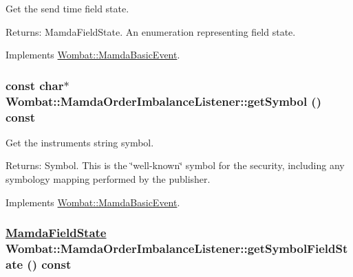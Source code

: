 Get the send time field state. 

\begin{Desc}
\item[Returns:]Mamda\-Field\-State. An enumeration representing field state. \end{Desc}


Implements \hyperlink{classWombat_1_1MamdaBasicEvent_418ecb29b412cd42581b54c87b5360fd}{Wombat::Mamda\-Basic\-Event}.\hypertarget{classWombat_1_1MamdaOrderImbalanceListener_de961c5bbeedc9f69136682e1adaf495}{
\subsubsection[getSymbol]{\setlength{\rightskip}{0pt plus 5cm}const char$\ast$ Wombat::Mamda\-Order\-Imbalance\-Listener::get\-Symbol () const}}
\label{classWombat_1_1MamdaOrderImbalanceListener_de961c5bbeedc9f69136682e1adaf495}


Get the instruments string symbol. 

\begin{Desc}
\item[Returns:]Symbol. This is the \char`\"{}well-known\char`\"{} symbol for the security, including any symbology mapping performed by the publisher. \end{Desc}


Implements \hyperlink{classWombat_1_1MamdaBasicEvent_8783b136a1305d21c578ced8618c090b}{Wombat::Mamda\-Basic\-Event}.\hypertarget{classWombat_1_1MamdaOrderImbalanceListener_0598f54a0e0c05667551187418173c22}{
\subsubsection[getSymbolFieldState]{\setlength{\rightskip}{0pt plus 5cm}\hyperlink{namespaceWombat_93aac974f2ab713554fd12a1fa3b7d2a}{Mamda\-Field\-State} Wombat::Mamda\-Order\-Imbalance\-Listener::get\-Symbol\-Field\-State () const}}
\label{classWombat_1_1MamdaOrderImbalanceListener_0598f54a0e0c05667551187418173c22}


